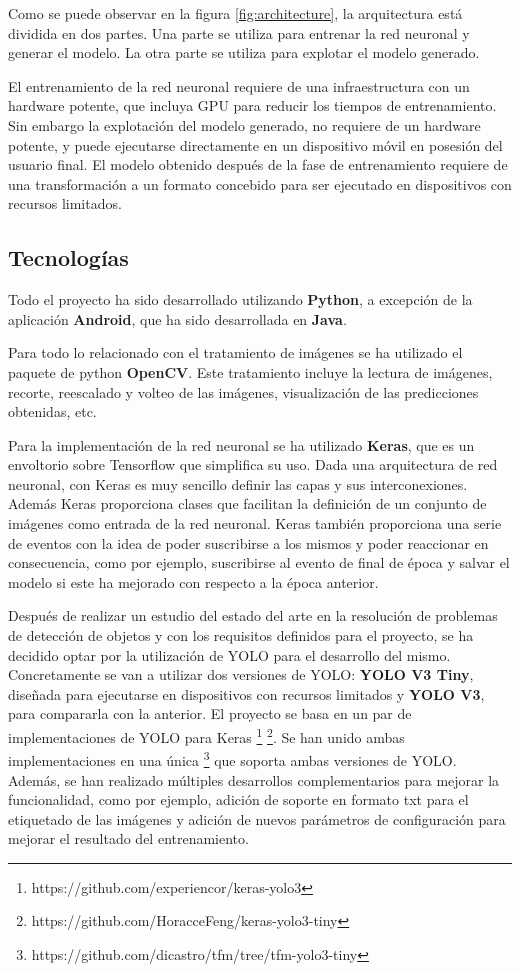 Como se puede observar en la figura \ref{fig:architecture}, la arquitectura está dividida en dos partes. Una parte se utiliza para entrenar la red neuronal y generar el modelo. La otra parte se utiliza para explotar el modelo generado.

El entrenamiento de la red neuronal requiere de una infraestructura con un hardware potente, que incluya GPU para reducir los tiempos de entrenamiento. Sin embargo la explotación del modelo generado, no  requiere de un hardware potente, y puede ejecutarse directamente en un dispositivo móvil en posesión del usuario final. El modelo obtenido después de la fase de entrenamiento requiere de una transformación a un formato concebido para ser ejecutado en dispositivos con recursos limitados.

\subsection{Tecnologías}

Todo el proyecto ha sido desarrollado utilizando \textbf{Python}, a excepción de la aplicación \textbf{Android}, que ha sido desarrollada en \textbf{Java}.

Para todo lo relacionado con el tratamiento de imágenes se ha utilizado el paquete de python \textbf{OpenCV}. Este tratamiento incluye la lectura de imágenes, recorte, reescalado y volteo de las imágenes, visualización de las predicciones obtenidas, etc.

Para la implementación de la red neuronal se ha utilizado \textbf{Keras}, que es un envoltorio sobre Tensorflow que simplifica su uso. Dada una arquitectura de red neuronal, con Keras es muy sencillo definir las capas y sus interconexiones. Además Keras proporciona clases que facilitan la definición de un conjunto de imágenes como entrada de la red neuronal. Keras también proporciona una serie de eventos con la idea de poder suscribirse a los mismos y poder reaccionar en consecuencia, como por ejemplo, suscribirse al evento de final de época y salvar el modelo si este ha mejorado con respecto a la época anterior.

Después de realizar un estudio del estado del arte en la resolución de problemas de detección de objetos y con los requisitos definidos para el proyecto, se ha decidido optar por la utilización de YOLO para el desarrollo del mismo. Concretamente se van a utilizar dos versiones de YOLO: \textbf{YOLO V3 Tiny}, diseñada para ejecutarse en dispositivos con recursos limitados y \textbf{YOLO V3}, para compararla con la anterior. El proyecto se basa en un par de implementaciones de YOLO para Keras \footnote{https://github.com/experiencor/keras-yolo3} \footnote{https://github.com/HoracceFeng/keras-yolo3-tiny}. Se han unido ambas implementaciones en una única \footnote{https://github.com/dicastro/tfm/tree/tfm-yolo3-tiny} que soporta ambas versiones de YOLO. Además, se han realizado múltiples desarrollos complementarios para mejorar la funcionalidad, como por ejemplo, adición de soporte en formato txt para el etiquetado de las imágenes y adición de nuevos parámetros de configuración para mejorar el resultado del entrenamiento.

